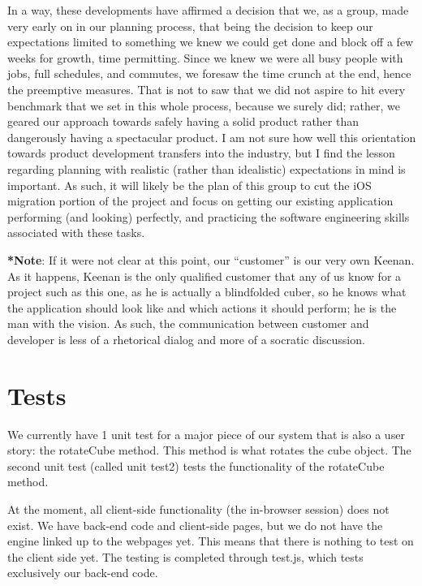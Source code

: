 \documentclass[12pt]{article}
\begin{document}
\par In a way, these developments have affirmed a decision that we, as a group, made very early on in our planning process, that being the decision to keep our expectations limited to something we knew we could get done and block off a few weeks for growth, time permitting. Since we knew we were all busy people with jobs, full schedules, and commutes, we foresaw the time crunch at the end, hence the preemptive measures. That is not to saw that we did not aspire to hit every benchmark that we set in this whole process, because we surely did; rather, we geared our approach towards safely having a solid product rather than dangerously having a  spectacular product. I am not sure how well this orientation towards product development transfers into the industry, but I find the lesson regarding planning with realistic (rather than idealistic) expectations in mind is important. As such, it will likely be the plan of this group to cut the iOS migration portion of the project and focus on getting our existing application performing (and looking) perfectly, and practicing the software engineering skills associated with these tasks. \\

\par \textbf{*Note}: If it were not clear at this point, our “customer” is our very own Keenan. As it happens, Keenan is the only qualified customer that any of us know for a project such as this one, as he is actually a blindfolded cuber, so he knows what the application should look like and which actions it should perform; he is the man with the vision. As such, the communication between customer and developer is less of a rhetorical dialog and more of a socratic discussion. \\

\section{Tests}

\par We currently have 1 unit test for a major piece of our system that is also a user story: the rotateCube method. This method is what rotates the cube object. The second unit test (called unit test2) tests the functionality of the rotateCube method. \\

\par At the moment, all client-side functionality (the in-browser session) does not exist. We have back-end code and client-side pages, but we do not have the engine linked up to the webpages yet. This means that there is nothing to test on the client side yet. The testing is completed through test.js, which tests exclusively our back-end code. \\
\end{document}
